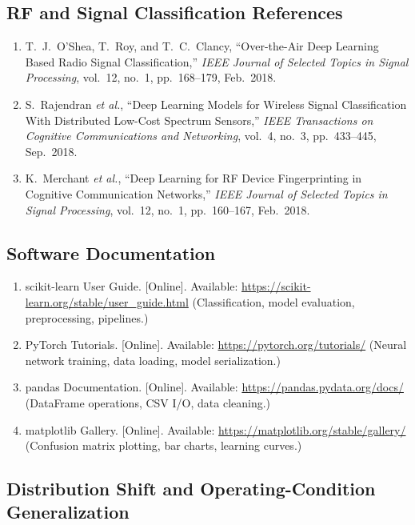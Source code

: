 \documentclass[11pt,letterpaper]{article}
\begin{document}
	\subsection{RF and Signal Classification References}

	\begin{enumerate}[leftmargin=2em]
		\item T.\ J.\ O'Shea, T.\ Roy, and T.\ C.\ Clancy, ``Over-the-Air Deep Learning Based Radio Signal Classification,'' \textit{IEEE Journal of Selected Topics in Signal Processing}, vol.~12, no.~1, pp.~168--179, Feb.\ 2018.
		\item S.\ Rajendran \textit{et al.}, ``Deep Learning Models for Wireless Signal Classification With Distributed Low-Cost Spectrum Sensors,'' \textit{IEEE Transactions on Cognitive Communications and Networking}, vol.~4, no.~3, pp.~433--445, Sep.\ 2018.
		\item K.\ Merchant \textit{et al.}, ``Deep Learning for RF Device Fingerprinting in Cognitive Communication Networks,'' \textit{IEEE Journal of Selected Topics in Signal Processing}, vol.~12, no.~1, pp.~160--167, Feb.\ 2018.
	\end{enumerate}

	\subsection{Software Documentation}

	\begin{enumerate}[leftmargin=2em]
		\item scikit-learn User Guide. [Online]. Available: \url{https://scikit-learn.org/stable/user_guide.html} (Classification, model evaluation, preprocessing, pipelines.)
		\item PyTorch Tutorials. [Online]. Available: \url{https://pytorch.org/tutorials/} (Neural network training, data loading, model serialization.)
		\item pandas Documentation. [Online]. Available: \url{https://pandas.pydata.org/docs/} (DataFrame operations, CSV I/O, data cleaning.)
		\item matplotlib Gallery. [Online]. Available: \url{https://matplotlib.org/stable/gallery/} (Confusion matrix plotting, bar charts, learning curves.)
	\end{enumerate}

	\subsection{Distribution Shift and Operating-Condition Generalization}
\end{document}
